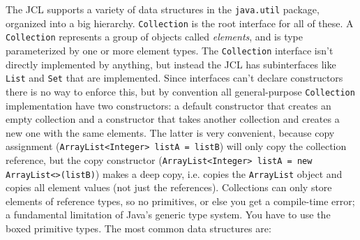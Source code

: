 \documentclass[table, xcdraw]{article}%
\begin{document}
The JCL supports a variety of data structures in the \texttt{java.util} package, organized into a big hierarchy. \texttt{Collection} is the root interface for all of these. A \texttt{Collection} represents a group of objects called \emph{elements}, and is type parameterized by one or more element types. The \texttt{Collection} interface isn't directly implemented by anything, but instead the JCL has subinterfaces like \texttt{List} and \texttt{Set} that are implemented. Since interfaces can't declare constructors there is no way to enforce this, but by convention all general-purpose \texttt{Collection} implementation have two constructors: a default constructor that creates an empty collection and a constructor that takes another collection and creates a new one with the same elements. The latter is very convenient, because copy assignment (\texttt{ArrayList<Integer> listA = listB}) will only copy the collection reference, but the copy constructor (\texttt{ArrayList<Integer> listA = new ArrayList<>(listB)}) makes a deep copy, i.e. copies the \texttt{ArrayList} object and copies all element values (not just the references). Collections can only store elements of reference types, so no primitives, or else you get a compile-time error; a fundamental limitation of Java's generic type system. You have to use the boxed primitive types.
The most common data structures are:
\end{document}
